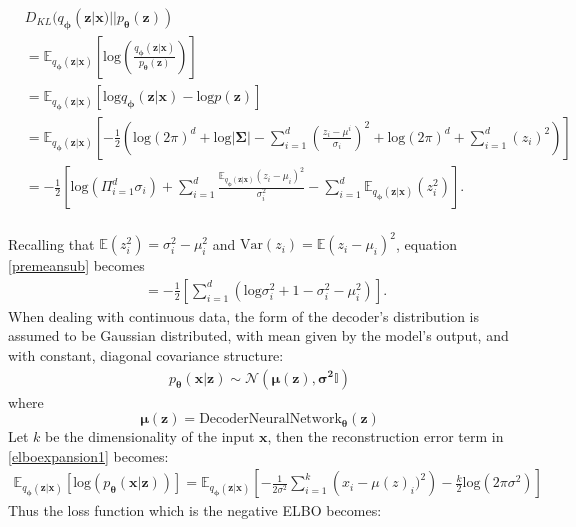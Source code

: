 \documentclass{article}
\theoremstyle{definition}
\begin{document}
\begin{align}
    &D_{KL}(q_{\boldsymbol{\phi}}(\mathbf{z}|\mathbf{x})||p_{\boldsymbol{\theta}}(\mathbf{z}))\\ 
    &= \mathbb{E}_{q_{\boldsymbol{\phi}}(\mathbf{z}|\mathbf{x})}\left[\text{log}\left(\frac{{q_{\boldsymbol{\phi}}(\mathbf{z}|\mathbf{x})}}{p_{\boldsymbol{\theta}}(\mathbf{z})}\right)\right]\\
    &=\mathbb{E}_{q_{\boldsymbol{\phi}}(\mathbf{z}|\mathbf{x})}\left[\text{log}q_{\boldsymbol{\phi}}(\mathbf{z}|\mathbf{x}) - \text{log}p(\textbf{z})\right]\\
    &=\mathbb{E}_{q_{\boldsymbol{\phi}}(\mathbf{z}|\mathbf{x})}\left[-\frac{1}{2}\left(\text{log}(2\pi)^d+\text{log}|\boldsymbol{\Sigma}|-\sum_{i=1}^{d}\left(\frac{z_i-\mu^i}{\sigma_i}\right)^2+\text{log}(2\pi)^d+\sum_{i=1}^{d} (z_i)^2\right)\right]\\
    \label{premeansub}
    &=-\frac{1}{2}\left[\text{log}\left(\Pi_{i=1}^d\sigma_i\right) + \sum_{i=1}^d\frac{\mathbb{E}_{q_{\boldsymbol{\phi}}(\mathbf{z}|\mathbf{x})}(z_i-\mu_i)^2}{\sigma_i^2}-\sum_{i=1}^d\mathbb{E}_{q_{\boldsymbol{\phi}}(\mathbf{z}|\mathbf{x})}(z_i^2)\right].
\end{align}\\
Recalling that $\mathbb{E}(z_i^2) = \sigma_i^2-\mu_i^2$ and $\text{Var}(z_i) = \mathbb{E}(z_i-\mu_i)^2$, equation \ref{premeansub} becomes
\begin{align}
    &=-\frac{1}{2}\left[\sum_{i=1}^d\left(\text{log}\sigma_i^2 + 1 -\sigma_i^2-\mu_i^2\right)\right].
\end{align}
\noindent
When dealing with continuous data, the form of the decoder's distribution is assumed to be Gaussian distributed, with mean given by the model's output, and with constant, diagonal covariance structure:
\begin{align}
    p_{\boldsymbol{\theta}}(\mathbf{x}|\mathbf{z}) \sim \mathcal{N}\left(\boldsymbol{\mu}(\mathbf{z}), \boldsymbol{\sigma^2}\mathbb{I}\right)
\end{align} 
where 
$$\boldsymbol{\mu}(\mathbf{z}) = \text{DecoderNeuralNetwork}_{\boldsymbol{\theta}}(\mathbf{z})$$
Let $k$ be the dimensionality of the input $\mathbf{x}$, then the reconstruction error term in \ref{elboexpansion1} becomes:
\begin{align}
\label{reconstruction pre derivative}
    \mathbb{E}_{q_{\boldsymbol{\phi}}(\mathbf{z}|\mathbf{x})}\left[\text{log}\left(p_{\boldsymbol{\theta}}(\mathbf{x}| \mathbf{z})\right)\right] = \mathbb{E}_{q_{\boldsymbol{\phi}}(\mathbf{z}|\mathbf{x})}\left[-\frac{1}{2\sigma^2}\sum_{i=1}^{k}\left(x_i-\mu(z)_i)^2\right)-\frac{k}{2}\text{log}(2\pi\sigma^2)\right] 
\end{align}
Thus the loss function which is the negative ELBO becomes:
\end{document}
